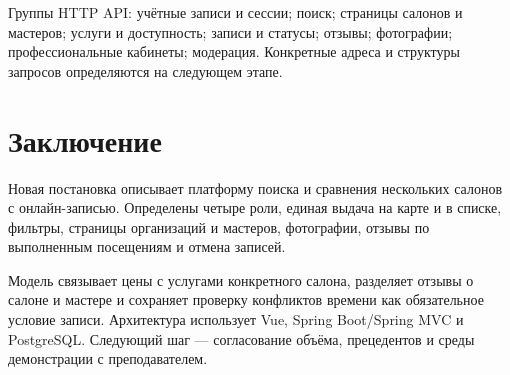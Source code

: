 Группы HTTP API: учётные записи и сессии; поиск; страницы салонов и мастеров; услуги и доступность; записи и статусы; отзывы; фотографии; профессиональные кабинеты; модерация. Конкретные адреса и структуры запросов определяются на следующем этапе.

\section{Заключение}
Новая постановка описывает платформу поиска и сравнения нескольких салонов с онлайн-записью. Определены четыре роли, единая выдача на карте и в списке, фильтры, страницы организаций и мастеров, фотографии, отзывы по выполненным посещениям и отмена записей.

Модель связывает цены с услугами конкретного салона, разделяет отзывы о салоне и мастере и сохраняет проверку конфликтов времени как обязательное условие записи. Архитектура использует Vue, Spring Boot/Spring MVC и PostgreSQL. Следующий шаг --- согласование объёма, прецедентов и среды демонстрации с преподавателем.

